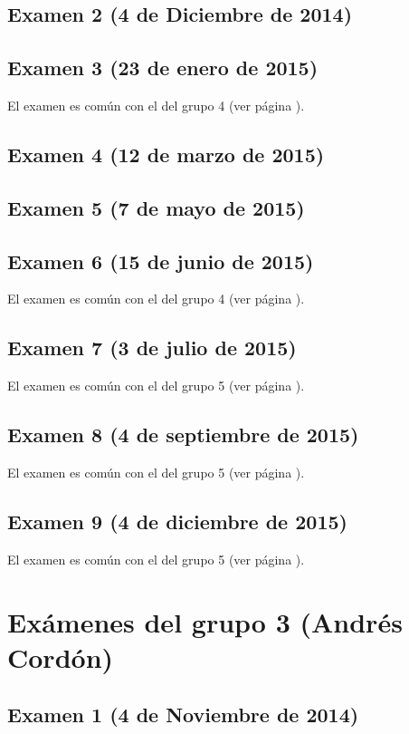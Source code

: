 \documentclass[a4paper,12pt,twoside]{book}
\begin{document}
\subsection{Examen 2 (4 de Diciembre de 2014)}
\subsection{Examen 3 (23 de enero de 2015)}
El examen es común con el del grupo 4 (ver página \pageref{examen_14_15_4_3}).
\subsection{Examen 4 (12 de marzo de 2015)}
\subsection{Examen 5 (7 de mayo de 2015)}
\subsection{Examen 6 (15 de junio de 2015)}
El examen es común con el del grupo 4 (ver página \pageref{examen_14_15_4_6}).
\subsection{Examen 7 (3 de julio de 2015)}
El examen es común con el del grupo 5 (ver página \pageref{examen_14_15_5_7}).
\subsection{Examen 8 (4 de septiembre de 2015)}
El examen es común con el del grupo 5 (ver página \pageref{examen_14_15_5_8}).
\subsection{Examen 9 (4 de diciembre de 2015)}
El examen es común con el del grupo 5 (ver página \pageref{examen_14_15_5_9}).

\section{Exámenes del grupo 3 (Andrés Cordón)}
\subsection{Examen 1 (4 de Noviembre de 2014)}
\end{document}
